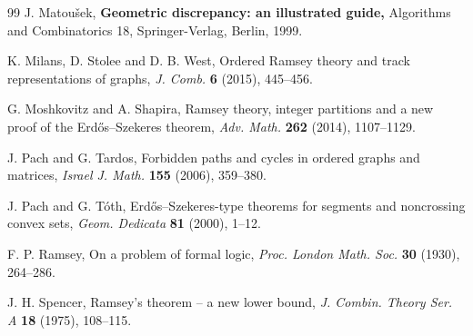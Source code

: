 \documentclass[11pt]{article}
\begin{document}
\begin{thebibliography}{99}
{J. Matou\v sek,} {\bf Geometric discrepancy: an illustrated guide,} Algorithms and Combinatorics 18, Springer-Verlag, Berlin, 1999.

K. Milans, D. Stolee and D. B. West, Ordered Ramsey theory and track representations of graphs, {\it J. Comb.} {\bf 6} (2015), 445--456. 

G. Moshkovitz and A. Shapira, Ramsey theory, integer partitions and a new proof of the Erd\H{o}s--Szekeres  theorem, {\it Adv. Math.} {\bf 262} (2014), 1107--1129. 

J. Pach and G. Tardos, Forbidden paths and cycles in ordered graphs and matrices, {\it Israel J. Math.} {\bf 155} (2006), 359--380.

J. Pach and G. T\'oth, Erd\H{o}s--Szekeres-type theorems for segments and noncrossing convex sets, 
{\it Geom. Dedicata} {\bf 81} (2000), 1--12.

F. P. Ramsey, On a problem of formal logic, {\it Proc. London Math. Soc.} {\bf 30} (1930), 264--286.

J. H. Spencer, Ramsey's theorem -- a new lower bound, {\it J. Combin. Theory Ser. A} {\bf 18} (1975), 108--115.

\end{thebibliography}
\end{document}
